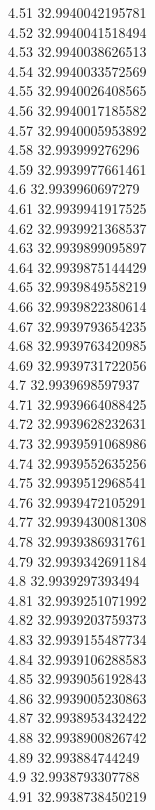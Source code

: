 {4.51	32.9940042195781\\
4.52	32.9940041518494\\
4.53	32.9940038626513\\
4.54	32.9940033572569\\
4.55	32.9940026408565\\
4.56	32.9940017185582\\
4.57	32.9940005953892\\
4.58	32.993999276296\\
4.59	32.9939977661461\\
4.6	32.9939960697279\\
4.61	32.9939941917525\\
4.62	32.9939921368537\\
4.63	32.9939899095897\\
4.64	32.9939875144429\\
4.65	32.9939849558219\\
4.66	32.9939822380614\\
4.67	32.9939793654235\\
4.68	32.9939763420985\\
4.69	32.9939731722056\\
4.7	32.9939698597937\\
4.71	32.9939664088425\\
4.72	32.9939628232631\\
4.73	32.9939591068986\\
4.74	32.9939552635256\\
4.75	32.9939512968541\\
4.76	32.9939472105291\\
4.77	32.9939430081308\\
4.78	32.9939386931761\\
4.79	32.9939342691184\\
4.8	32.9939297393494\\
4.81	32.9939251071992\\
4.82	32.9939203759373\\
4.83	32.9939155487734\\
4.84	32.9939106288583\\
4.85	32.9939056192843\\
4.86	32.9939005230863\\
4.87	32.9938953432422\\
4.88	32.9938900826742\\
4.89	32.993884744249\\
4.9	32.9938793307788\\
4.91	32.9938738450219\\
}
